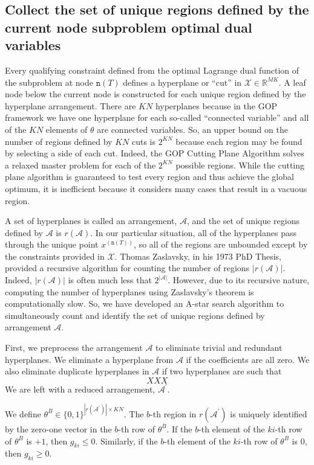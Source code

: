 \documentclass[11pt]{article}
\newcommand{\RR}{\ensuremath{\mathbb{R}}}
\renewcommand{\leq}{\leqslant}
\renewcommand{\geq}{\geqslant}
\newcommand{\node}{\texttt{n}}
\newcommand{\A}{\mathcal{A}}
\newcommand{\Ap}{\mathcal{A}^\prime}
\begin{document}
\subsection{Collect the set of unique regions defined by the current node subproblem optimal dual variables}

Every qualifying constraint defined from the optimal Lagrange dual function of the subproblem at node $\node(T)$ defines a hyperplane or ``cut'' in $\mathcal{X} \in \RR^{MK}$.
A leaf node below the current node is constructed for each unique region defined by the hyperplane arrangement.
There are $KN$ hyperplanes because in the GOP framework we have one hyperplane for each so-called ``connected variable'' and all of the $KN$ elements of $\theta$ are connected variables.
So, an upper bound on the number of regions defined by $KN$ cuts is $2^{KN}$ because each region may be found by selecting a side of each cut.
Indeed, the GOP Cutting Plane Algorithm solves a relaxed master problem for each of the $2^{KN}$ possible regions.
While the cutting plane algorithm is guaranteed to test every region and thus achieve the global optimum, it is inefficient because it considers many cases that result in a vacuous region.

A set of hyperplanes is called an arrangement, $\A$, and the set of unique regions defined by $\A$ is $r(\mathcal{A})$.
In our particular situation, all of the hyperplanes pass through the unique point $x^{(\node(T))}$, so all of the regions are unbounded except by the constraints provided in $\mathcal{X}$.
Thomas Zaslavsky, in his 1973 PhD Thesis, provided a recursive algorithm for counting the number of regions $|r(\A)|$.
Indeed, $|r(\A)|$ is often much less that $2^{|\A|}$.
However, due to its recursive nature, computing the number of hyperplanes using Zaslavsky's theorem is computationally slow.
So, we have developed an A-star search algorithm to simultaneously count and identify the set of unique regions defined by arrangement $\A$.

First, we preprocess the arrangement $\A$ to eliminate trivial and redundant hyperplanes.
We eliminate a hyperplane from $\A$ if the coefficients are all zero.
We also eliminate duplicate hyperplanes in $\A$ if two hyperplanes are such that
\begin{equation*}
XXX
\end{equation*}
We are left with a reduced arrangement, $\A^\prime$.

We define $\theta^{B} \in \{0,1\}^{|r(\Ap)| \times KN}$. 
The $b$-th region in $r(\Ap)$ is uniquely identified by the zero-one vector in the $b$-th row of $\theta^{B}$.
If the $b$-th element of the $ki$-th row of $\theta^{B}$ is $+1$, then $g_{ki} \leq 0$.
Similarly, if the $b$-th element of the $ki$-th row of $\theta^{B}$ is $0$, then $g_{ki} \geq 0$.
\end{document}
